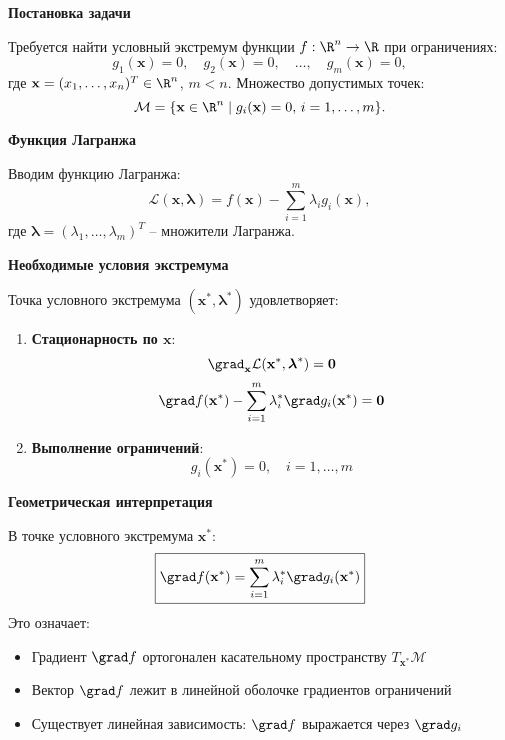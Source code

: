 \begin{center}
\large\textbf{Постановка задачи}
\end{center}
Требуется найти условный экстремум функции $f: \R^n \to \R$ при ограничениях:
\[
g_1(\mathbf{x}) = 0, \quad g_2(\mathbf{x}) = 0, \quad \dots, \quad g_m(\mathbf{x}) = 0,
\]
где $\mathbf{x} = (x_1, \dots, x_n)^T \in \R^n$, $m < n$. Множество допустимых точек:
\[
\mathcal{M} = \{ \mathbf{x} \in \R^n \mid g_i(\mathbf{x}) = 0, \, i = 1,\dots,m \}.
\]

\begin{center}
\large\textbf{Функция Лагранжа}
\end{center}
Вводим функцию Лагранжа:
\[
\mathcal{L}(\mathbf{x}, \boldsymbol{\lambda}) = f(\mathbf{x}) - \sum_{i=1}^m \lambda_i g_i(\mathbf{x}),
\]
где $\boldsymbol{\lambda} = (\lambda_1, \dots, \lambda_m)^T$ -- множители Лагранжа.

\begin{center}
\large\textbf{Необходимые условия экстремума}
\end{center}
Точка условного экстремума $(\mathbf{x}^*, \boldsymbol{\lambda}^*)$ удовлетворяет:
\begin{enumerate}
    \item \textbf{Стационарность по $\mathbf{x}$}:
    \[
    \grad_{\mathbf{x}} \mathcal{L}(\mathbf{x}^*, \boldsymbol{\lambda}^*) = \mathbf{0}
    \]
    \[
    \grad f(\mathbf{x}^*) - \sum_{i=1}^m \lambda_i^* \grad g_i(\mathbf{x}^*) = \mathbf{0}
    \]
    
    \item \textbf{Выполнение ограничений}:
    \[
    g_i(\mathbf{x}^*) = 0, \quad i = 1, \dots, m
    \]
\end{enumerate}

\begin{center}
\large\textbf{Геометрическая интерпретация}
\end{center}
В точке условного экстремума $\mathbf{x}^*$:
\[
\boxed{\grad f(\mathbf{x}^*) = \sum_{i=1}^m \lambda_i^* \grad g_i(\mathbf{x}^*)}
\]
Это означает:
\begin{itemize}
    \item Градиент $\grad f$ ортогонален касательному пространству $T_{\mathbf{x}^*}\mathcal{M}$
    \item Вектор $\grad f$ лежит в линейной оболочке градиентов ограничений
    \item Существует линейная зависимость: $\grad f$ выражается через $\grad g_i$
\end{itemize}

